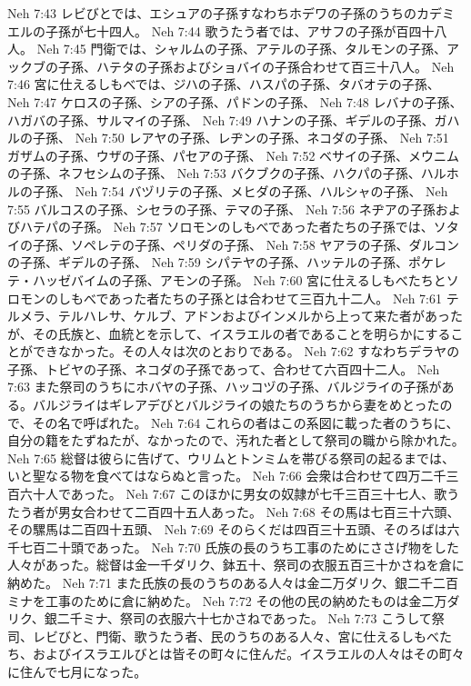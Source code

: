 Neh 7:43  レビびとでは、エシュアの子孫すなわちホデワの子孫のうちのカデミエルの子孫が七十四人。
Neh 7:44  歌うたう者では、アサフの子孫が百四十八人。
Neh 7:45  門衛では、シャルムの子孫、アテルの子孫、タルモンの子孫、アックブの子孫、ハテタの子孫およびショバイの子孫合わせて百三十八人。
Neh 7:46  宮に仕えるしもべでは、ジハの子孫、ハスパの子孫、タバオテの子孫、
Neh 7:47  ケロスの子孫、シアの子孫、パドンの子孫、
Neh 7:48  レバナの子孫、ハガバの子孫、サルマイの子孫、
Neh 7:49  ハナンの子孫、ギデルの子孫、ガハルの子孫、
Neh 7:50  レアヤの子孫、レヂンの子孫、ネコダの子孫、
Neh 7:51  ガザムの子孫、ウザの子孫、パセアの子孫、
Neh 7:52  ベサイの子孫、メウニムの子孫、ネフセシムの子孫、
Neh 7:53  バクブクの子孫、ハクパの子孫、ハルホルの子孫、
Neh 7:54  バヅリテの子孫、メヒダの子孫、ハルシャの子孫、
Neh 7:55  バルコスの子孫、シセラの子孫、テマの子孫、
Neh 7:56  ネヂアの子孫およびハテパの子孫。
Neh 7:57  ソロモンのしもべであった者たちの子孫では、ソタイの子孫、ソペレテの子孫、ペリダの子孫、
Neh 7:58  ヤアラの子孫、ダルコンの子孫、ギデルの子孫、
Neh 7:59  シパテヤの子孫、ハッテルの子孫、ポケレテ・ハッゼバイムの子孫、アモンの子孫。
Neh 7:60  宮に仕えるしもべたちとソロモンのしもべであった者たちの子孫とは合わせて三百九十二人。
Neh 7:61  テルメラ、テルハレサ、ケルブ、アドンおよびインメルから上って来た者があったが、その氏族と、血統とを示して、イスラエルの者であることを明らかにすることができなかった。その人々は次のとおりである。
Neh 7:62  すなわちデラヤの子孫、トビヤの子孫、ネコダの子孫であって、合わせて六百四十二人。
Neh 7:63  また祭司のうちにホバヤの子孫、ハッコヅの子孫、バルジライの子孫がある。バルジライはギレアデびとバルジライの娘たちのうちから妻をめとったので、その名で呼ばれた。
Neh 7:64  これらの者はこの系図に載った者のうちに、自分の籍をたずねたが、なかったので、汚れた者として祭司の職から除かれた。
Neh 7:65  総督は彼らに告げて、ウリムとトンミムを帯びる祭司の起るまでは、いと聖なる物を食べてはならぬと言った。
Neh 7:66  会衆は合わせて四万二千三百六十人であった。
Neh 7:67  このほかに男女の奴隷が七千三百三十七人、歌うたう者が男女合わせて二百四十五人あった。
Neh 7:68  その馬は七百三十六頭、その騾馬は二百四十五頭、
Neh 7:69  そのらくだは四百三十五頭、そのろばは六千七百二十頭であった。
Neh 7:70  氏族の長のうち工事のためにささげ物をした人々があった。総督は金一千ダリク、鉢五十、祭司の衣服五百三十かさねを倉に納めた。
Neh 7:71  また氏族の長のうちのある人々は金二万ダリク、銀二千二百ミナを工事のために倉に納めた。
Neh 7:72  その他の民の納めたものは金二万ダリク、銀二千ミナ、祭司の衣服六十七かさねであった。
Neh 7:73  こうして祭司、レビびと、門衛、歌うたう者、民のうちのある人々、宮に仕えるしもべたち、およびイスラエルびとは皆その町々に住んだ。イスラエルの人々はその町々に住んで七月になった。

